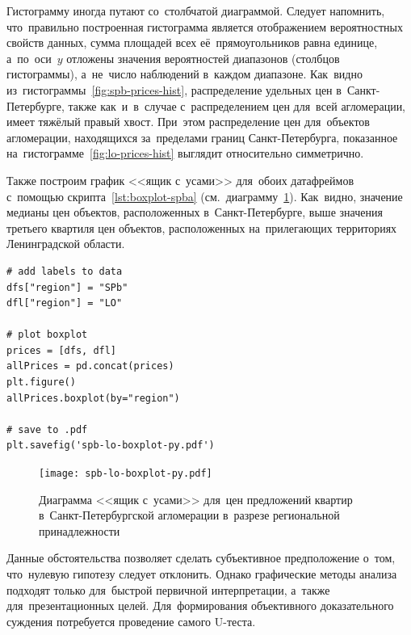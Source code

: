 \documentclass[]{scrreprt}
\begin{document}
Гистограмму иногда путают со~столбчатой диаграммой. Следует напомнить, что~правильно построенная гистограмма является отображением вероятностных свойств данных, сумма площадей всех её~прямоугольников равна единице, а~по~оси~$y$ отложены значения вероятностей диапазонов (столбцов гистограммы), а~не~число наблюдений в~каждом диапазоне. Как~видно из~гистограммы~\ref{fig:spb-prices-hist}, распределение удельных цен в~Санкт-Петербурге, также как~и~в~случае с~распределением цен для~всей агломерации, имеет тяжёлый правый хвост. При~этом распределение цен для~объектов агломерации, находящихся за~пределами границ Санкт-Петербурга, показанное на~гистограмме~\ref{fig:lo-prices-hist} выглядит относительно симметрично.

Также построим график <<ящик с~усами>> для~обоих датафреймов с~помощью скрипта~\ref{lst:boxplot-spba} (см.~диаграмму~\ref{fig:spb-lo-boxplot-py}). Как~видно, значение медианы цен объектов, расположенных в~Санкт-Петербурге, выше значения третьего квартиля цен объектов, расположенных на~прилегающих территориях Ленинградской области.
%
\begin{lstlisting}[float, caption = Построение диаграммы <<ящик с~усами>>~(boxplot) для~обеих подвыборок, firstnumber=1, label= lst:boxplot-spba]
# add labels to data
dfs["region"] = "SPb"
dfl["region"] = "LO"

# plot boxplot
prices = [dfs, dfl]
allPrices = pd.concat(prices)
plt.figure()
allPrices.boxplot(by="region")

# save to .pdf
plt.savefig('spb-lo-boxplot-py.pdf')
\end{lstlisting} 
%
\begin{figure}[ht]
	\centering
	\texttt{[image: spb-lo-boxplot-py.pdf]}
	\caption{Диаграмма <<ящик с~усами>> для~цен предложений квартир в~Санкт-Петербургской агломерации в~разрезе региональной принадлежности}
	\label{fig:spb-lo-boxplot-py}
\end{figure}
%

Данные обстоятельства позволяет сделать субъективное предположение о~том, что~нулевую гипотезу следует отклонить. Однако графические методы анализа подходят только для~быстрой первичной интерпретации, а~также для~презентационных целей. Для~формирования объективного доказательного суждения потребуется проведение самого U-теста. 
\end{document}
